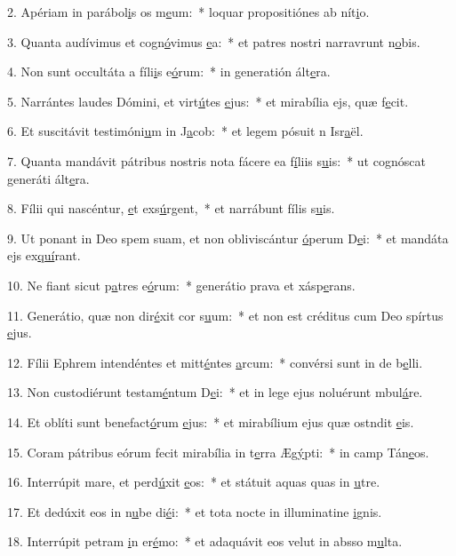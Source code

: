2. Apériam in parábol\uline{i}s os m\uline{e}um:~* loquar propositiónes ab nít\uline{i}o.\par 
3. Quanta audívimus et cogn\uline{ó}vimus \uline{e}a:~* et patres nostri narravrunt n\uline{o}bis.\par 
4. Non sunt occultáta a fíli\uline{i}s e\uline{ó}rum:~* in generatión ált\uline{e}ra.\par 
5. Narrántes laudes Dómini, et virt\uline{ú}tes \uline{e}jus:~* et mirabília ejs, quæ f\uline{e}cit.\par 
6. Et suscitávit testimóni\uline{u}m in J\uline{a}cob:~* et legem pósuit n Isr\uline{a}ël.\par 
7. Quanta mandávit pátribus nostris nota fácere ea f\uline{í}liis s\uline{u}is:~* ut cognóscat generáti ált\uline{e}ra.\par 
8. Fílii qui nascéntur, \uline{e}t exs\uline{ú}rgent,~* et narrábunt fílis s\uline{u}is.\par 
9. Ut ponant in Deo spem suam, et non obliviscántur \uline{ó}perum D\uline{e}i:~* et mandáta ejs ex\uline{quí}rant.\par 
10. Ne fiant sicut p\uline{a}tres e\uline{ó}rum:~* generátio prava et xásp\uline{e}rans.\par 
11. Generátio, quæ non dir\uline{é}xit cor s\uline{u}um:~* et non est créditus cum Deo spírtus \uline{e}jus.\par 
12. Fílii Ephrem intendéntes et mitt\uline{é}ntes \uline{a}rcum:~* convérsi sunt in de b\uline{e}lli.\par 
13. Non custodiérunt testam\uline{é}ntum D\uline{e}i:~* et in lege ejus noluérunt mbul\uline{á}re.\par 
14. Et oblíti sunt benefact\uline{ó}rum \uline{e}jus:~* et mirabílium ejus quæ ostndit \uline{e}is.\par 
15. Coram pátribus eórum fecit mirabília in t\uline{e}rra Æg\uline{ý}pti:~* in camp Tán\uline{e}os.\par 
16. Interrúpit mare, et perd\uline{ú}xit \uline{e}os:~* et státuit aquas quas in \uline{u}tre.\par 
17. Et dedúxit eos in n\uline{u}be di\uline{é}i:~* et tota nocte in illuminatine \uline{i}gnis.\par 
18. Interrúpit petram \uline{i}n er\uline{é}mo:~* et adaquávit eos velut in absso m\uline{u}lta.\par 
